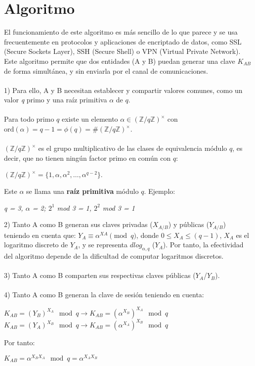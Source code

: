 \documentclass[11pt]{article}
\begin{document}
\section{Algoritmo}
El funcionamiento de este algoritmo es más sencillo de lo que parece y se usa frecuentemente en protocolos y aplicaciones de encriptado de datos, como SSL (Secure Sockets Layer), SSH (Secure Shell) o VPN (Virtual Private Network). Este algoritmo permite que dos entidades (A y B) puedan generar una clave $K_{AB}$ de forma simultánea, y sin enviarla por el canal de comunicaciones. \\\\
1) Para ello, A y B necesitan establecer y compartir valores comunes, como un valor \textit{q} primo y una raíz primitiva $\alpha$  de $q$. \\\\
Para todo primo $q$ existe un elemento $\alpha \in (\mathbb{Z}/q\mathbb{Z})^{\times}$ con $\text{ord}(\alpha) = q - 1 = \phi(q) =  \# (\mathbb{Z}/q\mathbb{Z})^{\times}$. \\\\
$(\mathbb{Z}/q\mathbb{Z})^{\times}$ es el grupo multiplicativo de las clases de equivalencia módulo $q$, es decir, que no tienen ningún factor primo en común con $q$:
\begin{center}
$(\mathbb{Z}/q\mathbb{Z})^{\times} = \{1, \alpha, \alpha^2, \ldots, \alpha^{q-2}\}$.\\
\end{center}
Este $\alpha$ se llama una \textbf{raíz primitiva} módulo $q$. Ejemplo:
\begin{center}
\textit{q = 3, $\alpha$ = 2; $2^1$ mod 3 = 1, $2^2$ mod 3 = 1}
\end{center}
2) Tanto A como B generan sus claves privadas ($X_{A/B}$) y públicas ($Y_{A/B}$) teniendo en cuenta que:  $ Y_{A} \equiv \alpha^{XA} \pmod{q}$, donde $0 \le X_A \le (q-1)$, $X_A$ es el logaritmo discreto de $Y_A$, y se representa $dlog_{\alpha,q}$ ($Y_A$). Por tanto, la efectividad del algoritmo depende de la dificultad de computar logaritmos discretos.
\\\\
3) Tanto A como B comparten sus respectivas claves públicas ($Y_A$/$Y_B$).
\\\\
4) Tanto A como B generan la clave de sesión teniendo en cuenta: 
\begin{center}
$K_{AB} = (Y_B)^{X_A} \mod q \rightarrow K_{AB} = (\alpha^{X_B})^{X_A} \mod q$  \\
$K_{AB} = (Y_A)^{X_B} \mod q \rightarrow K_{AB} = (\alpha^{X_A})^{X_B} \mod q$  \\
\end{center}
Por tanto:
\begin{center}
$K_{AB} = \alpha^{X_B X_A} \mod q = \alpha^{X_A X_B}$
\end{center}
\end{document}

